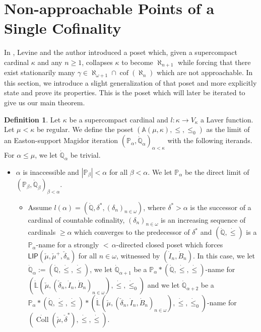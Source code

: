 \documentclass[a4paper]{amsart}
\theoremstyle{definition}
\newtheorem{mydef}{Definition}[section]
\theoremstyle{remark}
\theoremstyle{plain}
\numberwithin{mydef}{section}
\DeclareMathOperator{\cof}{cof}
\DeclareMathOperator{\Coll}{Coll}
\newcommand{\dA}{\mathbb{A}}
\newcommand{\dL}{\mathbb{L}}
\newcommand{\dP}{\mathbb{P}}
\newcommand{\dQ}{\mathbb{Q}}
\newcommand{\LIP}{\mathsf{LIP}}
\begin{document}
	\section{Non-approachable Points of a Single Cofinality}
	
	In \cite{JakobLevineFailureApproachability}, Levine and the author introduced a poset which, given a supercompact cardinal $\kappa$ and any $n\geq 1$, collapses $\kappa$ to become $\aleph_{n+1}$ while forcing that there exist stationarily many $\gamma\in\aleph_{\omega+1}\cap\cof(\aleph_n)$ which are not approachable. In this section, we introduce a slight generalization of that poset and more explicitly state and prove its properties. This is the poset which will later be iterated to give us our main theorem.
	
	\begin{mydef}\label{ADef}
		Let $\kappa$ be a supercompact cardinal and $l\colon\kappa\to V_{\kappa}$ a Laver function. Let $\mu<\kappa$ be regular. We define the poset $(\dA(\mu,\kappa),\leq,\leq_0)$ as the limit of an Easton-support Magidor iteration $(\dP_{\alpha},\dot{\dQ}_{\alpha})_{\alpha<\kappa}$ with the following iterands. For $\alpha\leq\mu$, we let $\dot{\dQ}_{\alpha}$ be trivial.
		\begin{itemize}
			\item[Case 1:] $\alpha$ is inaccessible and $|\dP_{\beta}|<\alpha$ for all $\beta<\alpha$. We let $\dP_{\alpha}$ be the direct limit of $(\dP_{\beta},\dot{\dQ}_{\beta})_{\beta<\alpha}$.
			\begin{itemize}
				\item[Case 1.1:] Assume $l(\alpha)=(\dot{\dQ},\delta^*,(\delta_n)_{n\in\omega})$, where $\delta^*>\alpha$ is the successor of a cardinal of countable cofinality, $(\delta_n)_{n\in\omega}$ is an increasing sequence of cardinals $\geq\alpha$ which converges to the predecessor of $\delta^*$ and $(\dot{\dQ},\dot{\leq})$ is a $\dP_{\alpha}$-name for a strongly ${<}\,\alpha$-directed closed poset which forces $\LIP(\check{\mu},\check{\mu}^+,\check{\delta}_n)$ for all $n\in\omega$, witnessed by $(\dot{I}_n,\dot{B}_n)$. In this case, we let $\dot{\dQ}_{\alpha}:=(\dot{\dQ},\dot{\leq},\dot{\leq})$, we let $\dot{\dQ}_{\alpha+1}$ be a $\dP_{\alpha}*(\dot{\dQ},\dot{\leq},\dot{\leq})$-name for $(\dot{\dL}(\check{\mu},(\check{\delta}_n,\dot{I}_n,\dot{B}_n)_{n\in\omega}),\dot{\leq},\dot{\leq}_0)$ and we let $\dot{\dQ}_{\alpha+2}$ be a $\dP_{\alpha}*(\dot{\dQ},\dot{\leq},\dot{\leq})*(\dot{\dL}(\check{\mu},(\check{\delta}_n,\dot{I}_n,\dot{B}_n)_{n\in\omega}),\dot{\leq},\dot{\leq}_0)$-name for $(\dot{\Coll}(\check{\mu},\check{\delta}^*),\dot{\leq},\dot{\leq})$.

\end{itemize}
\end{itemize}
\end{mydef}
\end{document}
